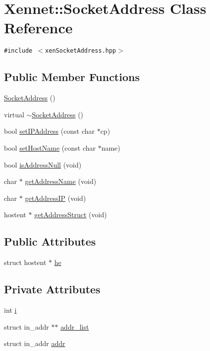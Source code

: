 \hypertarget{classXennet_1_1SocketAddress}{
\section{Xennet::SocketAddress Class Reference}
\label{classXennet_1_1SocketAddress}
}
{\tt \#include $<$xenSocketAddress.hpp$>$}

\subsection*{Public Member Functions}
\begin{CompactItemize}
\item 
\hyperlink{classXennet_1_1SocketAddress_16e560d92d78862d8c0da3c64d35d079}{SocketAddress} ()
\item 
virtual \hyperlink{classXennet_1_1SocketAddress_2e9d46f52ab4472f59c71a4dff475cd8}{$\sim$SocketAddress} ()
\item 
bool \hyperlink{classXennet_1_1SocketAddress_f5ca7d803d46ad00be03c16f0d66205d}{setIPAddress} (const char $\ast$cp)
\item 
bool \hyperlink{classXennet_1_1SocketAddress_a2c1c5639ce81303df2107fae300e5b8}{setHostName} (const char $\ast$name)
\item 
bool \hyperlink{classXennet_1_1SocketAddress_9be0cad32d9c917cc5735f59e9320904}{isAddressNull} (void)
\item 
char $\ast$ \hyperlink{classXennet_1_1SocketAddress_70b2d7158d8519a09fcdd5b2fb83532a}{getAddressName} (void)
\item 
char $\ast$ \hyperlink{classXennet_1_1SocketAddress_8a45c39941f54d3135464a5ac4fa1416}{getAddressIP} (void)
\item 
hostent $\ast$ \hyperlink{classXennet_1_1SocketAddress_cccc2fb3b090de4d1f86b94c526c636b}{getAddressStruct} (void)
\end{CompactItemize}
\subsection*{Public Attributes}
\begin{CompactItemize}
\item 
struct hostent $\ast$ \hyperlink{classXennet_1_1SocketAddress_065a63b0ddd2743979f60bed0228d4bc}{he}
\end{CompactItemize}
\subsection*{Private Attributes}
\begin{CompactItemize}
\item 
int \hyperlink{classXennet_1_1SocketAddress_f278e5c242778c1ffaac88fd303b8968}{i}
\item 
struct in\_\-addr $\ast$$\ast$ \hyperlink{classXennet_1_1SocketAddress_b72fd48ae36c1a0a8b77d6947e559ad5}{addr\_\-list}
\item 
struct in\_\-addr \hyperlink{classXennet_1_1SocketAddress_d52092d77a63d9c7a754741ebb1e79ac}{addr}
\end{CompactItemize}


